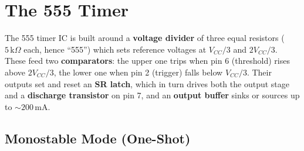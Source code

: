 \section{The 555 Timer}

\begin{definition}
The 555 timer IC is built around a \textbf{voltage divider} of three equal resistors ($5\,\text{k}\Omega$ each, hence ``555'') which sets reference voltages at $V_{CC}/3$ and $2V_{CC}/3$. These feed two \textbf{comparators}: the upper one trips when pin 6 (threshold) rises above $2V_{CC}/3$, the lower one when pin 2 (trigger) falls below $V_{CC}/3$. Their outputs set and reset an \textbf{SR latch}, which in turn drives both the output stage and a \textbf{discharge transistor} on pin 7, and an \textbf{output buffer} sinks or sources up to $\sim 200\,\text{mA}$.
\end{definition}

\subsection{Monostable Mode (One-Shot)}

